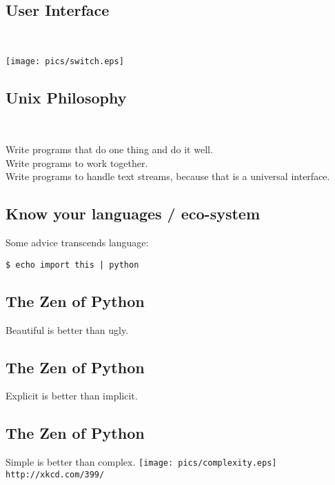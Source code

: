 \documentclass[xga]{xdvislides}
\begin{document}
\subsection{User Interface}
\\
\vspace*{\fill}
\begin{center}
	\texttt{[image: pics/switch.eps]}
\end{center}
\vspace*{\fill}


\subsection{Unix Philosophy}
\\
\Huge
\begin{center}
	Write programs that do one thing and do it well.\\
	\vspace{.5in}
	Write programs to work together. \\
	\vspace{.5in}
	Write programs to handle text streams, because that is a universal interface.
\end{center}
\Normalsize

\subsection{Know your languages / eco-system}
Some advice transcends language: \\

\begin{verbatim}
$ echo import this | python
\end{verbatim}

\subsection{The Zen of Python}
\Huge
\begin{center}
Beautiful is better than ugly.
\end{center}

\subsection{The Zen of Python}
\begin{center}
Explicit is better than implicit.
\end{center}

\subsection{The Zen of Python}
\begin{center}
    Simple is better than complex.
\vspace*{\fill}
	\texttt{[image: pics/complexity.eps]}
	\\
	\small \verb+http://xkcd.com/399/+
\end{center}
\vspace*{\fill}
\Huge
\end{document}
